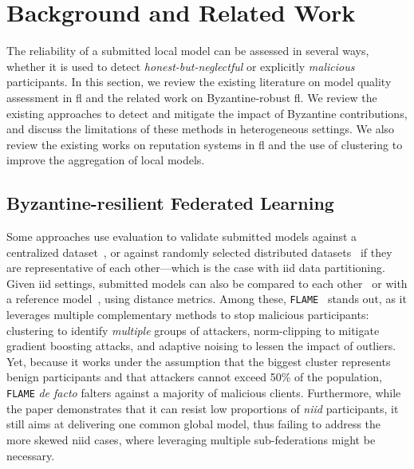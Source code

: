 \section{Background and Related Work\label{sec:radar.related}}

The reliability of a submitted local model can be assessed in several ways, whether it is used to detect \emph{honest-but-neglectful} or explicitly \emph{malicious} participants.
In this section, we review the existing literature on model quality assessment in \gls{fl} and the related work on Byzantine-robust \gls{fl}.
We review the existing approaches to detect and mitigate the impact of Byzantine contributions, and discuss the limitations of these methods in heterogeneous settings.
We also review the existing works on reputation systems in \gls{fl} and the use of clustering to improve the aggregation of local models.


\subsection{Byzantine-resilient Federated Learning\label{sec:radar.related.byzantine}}

Some approaches use evaluation to validate submitted models against a centralized dataset~\cite{cao_FLTrustByzantinerobustFederated_2022}, or against randomly selected distributed datasets~\cite{pejo_QualityInferenceFederated_2023} if they are representative of each other---which is the case with \gls{iid} data partitioning.
Given \gls{iid} settings, submitted models can also be compared to each other~\cite{blanchard_Machinelearningadversaries_2017,cao_FLTrustByzantinerobustFederated_2022,nguyen_FLAMETamingBackdoors_2022} or with a reference model~\cite{xia_ToFiAlgorithmDefend_2021,zhou_DifferentiallyPrivateFederated_2022}, using distance metrics.
Among these, \texttt{FLAME}~\cite{nguyen_FLAMETamingBackdoors_2022} stands out, as it leverages multiple complementary methods to stop malicious participants: clustering to identify \emph{multiple} groups of attackers, norm-clipping to mitigate gradient boosting attacks, and adaptive noising to lessen the impact of outliers.
Yet, because it works under the assumption that the biggest cluster represents benign participants and that attackers cannot exceed 50\% of the population, \texttt{FLAME} \emph{de facto} falters against a majority of malicious clients.
Furthermore, while the paper demonstrates that it can resist low proportions of \emph{\gls{niid}} participants, it still aims at delivering one common global model, thus failing to address the more skewed \gls{niid} cases, where leveraging multiple sub-federations might be necessary.


